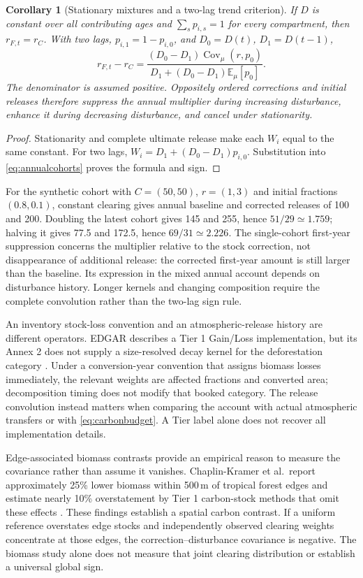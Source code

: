 \documentclass[11pt,a4paper]{article}
\newcommand{\E}{\mathbb{E}}
\DeclareMathOperator{\Cov}{Cov}
\newtheorem{corollary}[proposition]{Corollary}
\theoremstyle{remark}
\begin{document}
\begin{corollary}[Stationary mixtures and a two-lag trend criterion]\label{cor:annual}
If $D$ is constant over all contributing ages and $\sum_s p_{i,s}=1$ for every compartment, then $r_{F,t}=r_C$. With two lags, $p_{i,1}=1-p_{i,0}$, and $D_0=D(t)$, $D_1=D(t-1)$,
\begin{equation}
 r_{F,t}-r_C=
 \frac{(D_0-D_1)\Cov_\mu(r,p_0)}{D_1+(D_0-D_1)\E_\mu[p_0]}.
 \label{eq:annualtrend}
\end{equation}
The denominator is assumed positive. Oppositely ordered corrections and initial releases therefore suppress the annual multiplier during increasing disturbance, enhance it during decreasing disturbance, and cancel under stationarity.
\end{corollary}
\begin{proof}
Stationarity and complete ultimate release make each $W_i$ equal to the same constant. For two lags, $W_i=D_1+(D_0-D_1)p_{i,0}$. Substitution into \eqref{eq:annualcohorts} proves the formula and sign.
\end{proof}
For the synthetic cohort with $C=(50,50)$, $r=(1,3)$ and initial fractions $(0.8,0.1)$, constant clearing gives annual baseline and corrected releases of 100 and 200. Doubling the latest cohort gives 145 and 255, hence $51/29\simeq1.759$; halving it gives 77.5 and 172.5, hence $69/31\simeq2.226$. The single-cohort first-year suppression concerns the multiplier relative to the stock correction, not disappearance of additional release: the corrected first-year amount is still larger than the baseline. Its expression in the mixed annual account depends on disturbance history. Longer kernels and changing composition require the complete convolution rather than the two-lag sign rule.

An inventory stock-loss convention and an atmospheric-release history are different operators. EDGAR describes a Tier 1 Gain/Loss implementation, but its Annex 2 does not supply a size-resolved decay kernel for the deforestation category \citep{Crippa2026}. Under a conversion-year convention that assigns biomass losses immediately, the relevant weights are affected fractions and converted area; decomposition timing does not modify that booked category. The release convolution instead matters when comparing the account with actual atmospheric transfers or with \eqref{eq:carbonbudget}. A Tier label alone does not recover all implementation details.

Edge-associated biomass contrasts provide an empirical reason to measure the covariance rather than assume it vanishes. Chaplin-Kramer et al.\ report approximately 25\% lower biomass within 500\,m of tropical forest edges and estimate nearly 10\% overstatement by Tier 1 carbon-stock methods that omit these effects \citep{ChaplinKramer2015}. These findings establish a spatial carbon contrast. If a uniform reference overstates edge stocks and independently observed clearing weights concentrate at those edges, the correction--disturbance covariance is negative. The biomass study alone does not measure that joint clearing distribution or establish a universal global sign.
\end{document}
